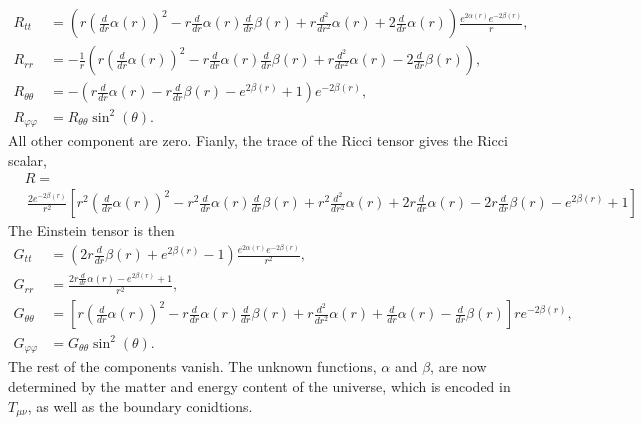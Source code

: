 \begin{align}
    R_{tt}
    & =
    \left(r \left(\frac{d}{d r} \alpha{\left(r \right)}\right)^{2} - r \frac{d}{d r} \alpha{\left(r \right)} \frac{d}{d r} \beta{\left(r \right)} + r \frac{d^{2}}{d r^{2}} \alpha{\left(r \right)} + 2 \frac{d}{d r} \alpha{\left(r \right)}
        \right)
    \frac{
         e^{2 \alpha{\left(r \right)}} e^{- 2 \beta{\left(r \right)}}}{r}, \\
    R_{rr}
    & =
    - \frac{1}{r}
    \left(
        r \left(\frac{d}{d r} \alpha{\left(r \right)}\right)^{2} - r \frac{d}{d r} \alpha{\left(r \right)} \frac{d}{d r} \beta{\left(r \right)} + r \frac{d^{2}}{d r^{2}} \alpha{\left(r \right)} - 2 \frac{d}{d r} \beta{\left(r \right)} 
    \right),\\
    R_{\theta \theta}
    &=
    - \left(r \frac{d}{d r} \alpha{\left(r \right)} - r \frac{d}{d r} \beta{\left(r \right)} - e^{2 \beta{\left(r \right)}} + 1\right) e^{- 2 \beta{\left(r \right)}}, \\
    R_{\varphi \varphi} & = R_{\theta \theta} \sin^2( \theta).
\end{align}
%
All other component are zero.
Fianly, the trace of the Ricci tensor gives the Ricci scalar, 
%
\begin{align}
    \nonumber
    &R = \\
    &\, \frac{2 e^{- 2 \beta{\left(r \right)}}}{r^{2}}
    \left[
             r^{2} \left(\frac{d}{d r} \alpha{\left(r \right)}\right)^{2} - r^{2} \frac{d}{d r} \alpha{\left(r \right)} \frac{d}{d r} \beta{\left(r \right)} + r^{2} \frac{d^{2}}{d r^{2}} \alpha{\left(r \right)} + 2 r \frac{d}{d r} \alpha{\left(r \right)} - 2 r \frac{d}{d r} \beta{\left(r \right)} - e^{2 \beta{\left(r \right)}} + 1
    \right]
\end{align}
%
The Einstein tensor is then
%
\begin{align}
    G_{tt}
    & =
    \left(2 r \frac{d}{d r} \beta{\left(r \right)} + e^{2 \beta{\left(r \right)}} - 1\right) 
    \frac{
        e^{2 \alpha{\left(r \right)}} e^{- 2 \beta{\left(r \right)}}
        }{r^{2}}, \\
    G_{rr}
    & =
    \frac{2 r \frac{d}{d r} \alpha{\left(r \right)} - e^{2 \beta{\left(r \right)}} + 1}{r^{2}}, \\
    G_{\theta \theta}
    &=
\left[
    r \left(\frac{d}{d r} \alpha{\left(r \right)}\right)^{2} - r \frac{d}{d r} \alpha{\left(r \right)} \frac{d}{d r} \beta{\left(r \right)} + r \frac{d^{2}}{d r^{2}} \alpha{\left(r \right)} + \frac{d}{d r} \alpha{\left(r \right)} - \frac{d}{d r} \beta{\left(r \right)}
\right]
re^{- 2 \beta{\left(r \right)}}, \\
G_{\varphi \varphi}
& =
G_{\theta\theta} \sin^2(\theta).
\end{align}
%
The rest of the components vanish.
The unknown functions, $\alpha$ and $\beta$, are now determined by the matter and energy content of the universe, which is encoded in $T_{\mu \nu}$, as well as the boundary conidtions.

